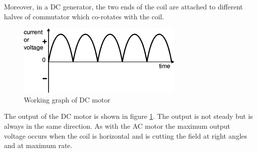 Moreover, in a DC generator, the two ends of the coil are attached to different halves of commutator which co-rotates with the coil.

 \begin{figure}[h]
    \centering    \includegraphics[width=.7\textwidth]{figures/graphDC.png}
    \caption{Working graph of DC motor } 
    \label{fig:DCmotor1} 
\end{figure}

The output of the DC motor is shown in figure \ref{fig:DCmotor1}. The output is not steady but is always in the same direction. As with the AC motor the maximum output voltage occurs when the coil is horizontal and is cutting the field at right angles and at maximum rate.

